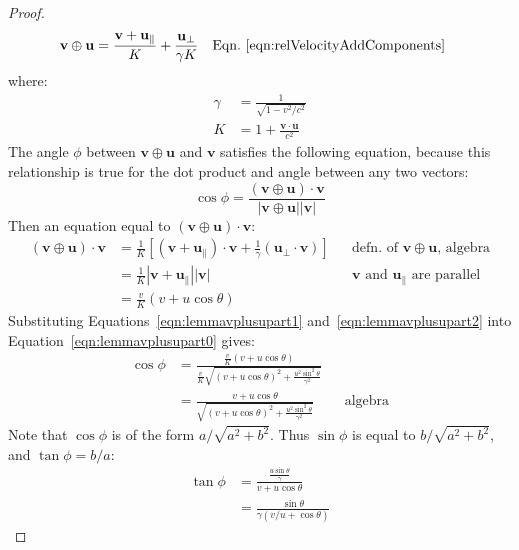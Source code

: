 \documentclass[a4paper]{article}
\theoremstyle{plain}
\theoremstyle{definition}
\newcommand{\vect}[1]{\mathbf{#1}}
\begin{document}
\begin{proof}
\begin{align*}
\vect{v} \oplus \vect{u}
  & = \frac{ \vect{v} + \vect{u}_{\parallel} }{K} + \frac{\vect{u}_{\perp}}{\gamma K} & & \text{Eqn.~\eqref{eqn:relVelocityAddComponents}}
\end{align*}
where:
\begin{align*}
\gamma & = \frac{1}{\sqrt{1 - v^2/c^2}} \\
K & = 1 + \frac{\vect{v} \cdot \vect{u}}{c^2}
\end{align*}
The angle $\phi$ between $\vect{v} \oplus \vect{u}$ and $\vect{v}$
satisfies the following equation, because this relationship is true
for the dot product and angle between any two vectors:
\begin{equation}
\cos \phi = \frac{(\vect{v} \oplus \vect{u}) \cdot \vect{v}}{|\vect{v} \oplus \vect{u}| |\vect{v}|} \label{eqn:lemmavplusupart0}
\end{equation}
Then an equation equal to $(\vect{v} \oplus \vect{u}) \cdot \vect{v}$:
\begin{align}
(\vect{v} \oplus \vect{u}) \cdot \vect{v}
  & = \frac{1}{K} \left[ (\vect{v} + \vect{u}_{\parallel}) \cdot \vect{v} + \frac{1}{\gamma} (\vect{u}_{\perp} \cdot \vect{v}) \right] & & \text{defn. of $\vect{v} \oplus \vect{u}$, algebra} \nonumber \\
  & = \frac{1}{K} |\vect{v} + \vect{u}_{\parallel}| |\vect{v}| & & \text{$\vect{v}$ and $\vect{u}_{\parallel}$ are parallel} \nonumber \\
  & = \frac{v}{K} (v + u \cos \theta) \label{eqn:lemmavplusupart2}
\end{align}
Substituting Equations~\eqref{eqn:lemmavplusupart1}
and~\eqref{eqn:lemmavplusupart2}
into Equation~\eqref{eqn:lemmavplusupart0} gives:
\begin{align*}
\cos \phi
  & = \frac{ \frac{v}{K} (v + u \cos \theta) }{ \frac{v}{K} \sqrt{ (v + u \cos \theta)^2 + \frac{u^2 \sin^2 \theta}{\gamma^2} } } \\
  & = \frac{ v + u \cos \theta }{ \sqrt{ (v + u \cos \theta)^2 + \frac{u^2 \sin^2 \theta}{\gamma^2} } } & & \text{algebra}
\end{align*}
Note that $\cos \phi$ is of the form $a / \sqrt{a^2 + b^2}$.
Thus $\sin \phi$ is equal to $b/ \sqrt{a^2 + b^2}$,
and $\tan \phi = b/a$:
\begin{align}
\tan \phi
  & = \frac{ \frac{u \sin \theta}{\gamma} }{ v + u \cos \theta } \nonumber \\
  & = \frac{ \sin \theta }{ \gamma (v/u + \cos \theta) }
\end{align}
\end{proof}
\end{document}
